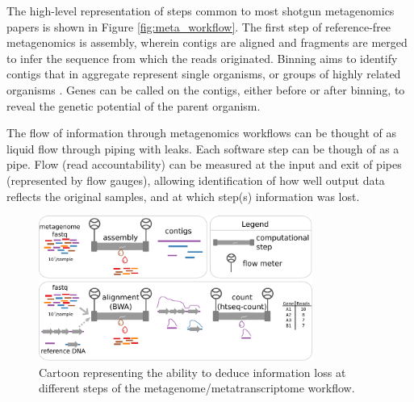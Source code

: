 The high-level representation of steps common to most shotgun metagenomics papers is shown in Figure \ref{fig:meta_workflow}.
The first step of reference-free metagenomics is assembly, wherein contigs are aligned and fragments are merged to infer the sequence from which the reads originated.
Binning aims to identify contigs that in aggregate represent single organisms, or groups of highly related organisms \cite{kunin2008}.
Genes can be called on the contigs, either before or after binning, to reveal the genetic potential of the parent organism.

The flow of information through metagenomics workflows can be thought of as liquid flow through piping with leaks.
Each software step can be though of as a pipe.
Flow (read accountability) can be measured at the input and exit of pipes (represented by flow gauges), allowing identification of how well output data reflects the original samples, and at which step(s) information was lost.

\begin{figure}[H]
\centering
    \includegraphics[width=0.8\textwidth]{./tex/chapter2/figures/170312_pipe_leaks.pdf}
    \begin{singlespace}
    \caption[Framework for assessing information loss in workflow steps.]{
        Cartoon representing the ability to deduce information loss at different steps of the metagenome/metatranscriptome workflow.}
    \label{fig:pipe_leaks}
    \end{singlespace}
\end{figure}

